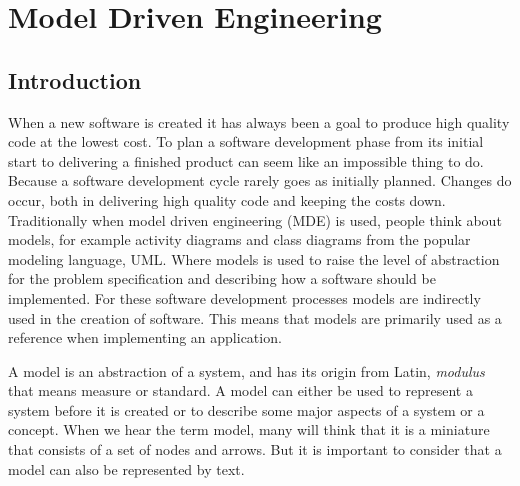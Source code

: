 
\chapter{Model Driven Engineering} %

\label{Chapter2} %



\section{Introduction}

When a new software is created it has always been a goal to produce high
quality code at the lowest cost. To plan a software development phase from its
initial start to delivering a finished product can seem like an impossible
thing to do. Because a software development cycle rarely goes as initially
planned. Changes do occur, both in delivering high quality code and keeping the
costs down. Traditionally when model driven engineering (MDE) is used, people
think about models, for example activity diagrams and class diagrams from the
popular modeling language, UML. Where models is used to raise the level
of abstraction for the problem specification and describing how a software
should be implemented. For these software development processes models are
indirectly used in the creation of software. This means that models are
primarily used as a reference when implementing an application.

A model is an abstraction of a system, and has its origin from Latin,
\textit{modulus} that means measure or standard. A model can either be used to
represent a system before it is created or to describe some major aspects of a
system or a concept. When we hear the term model, many will think that it
is a miniature that consists of a set of nodes and arrows. But it is important
to consider that a model can also be represented by text. 

